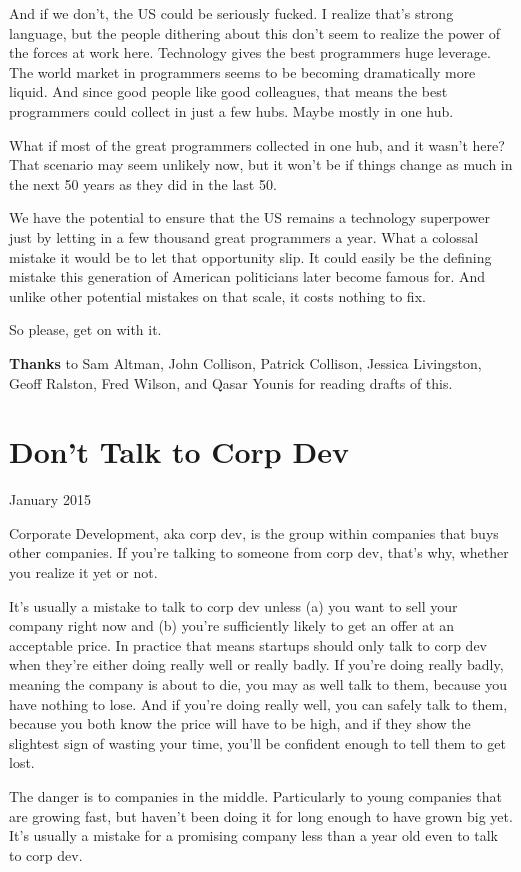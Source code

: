 \documentclass[12pt]{book}
\begin{document}
And if we don't, the US could be seriously fucked. I realize that's
strong language, but the people dithering about this don't seem to
realize the power of the forces at work here. Technology gives the best
programmers huge leverage. The world market in programmers seems to be
becoming dramatically more liquid. And since good people like good
colleagues, that means the best programmers could collect in just a few
hubs. Maybe mostly in one hub.

What if most of the great programmers collected in one hub, and it
wasn't here? That scenario may seem unlikely now, but it won't be if
things change as much in the next 50 years as they did in the last 50.

We have the potential to ensure that the US remains a technology
superpower just by letting in a few thousand great programmers a year.
What a colossal mistake it would be to let that opportunity slip. It
could easily be the defining mistake this generation of American
politicians later become famous for. And unlike other potential mistakes
on that scale, it costs nothing to fix.

So please, get on with it.


\textbf{Thanks} to Sam Altman, John Collison, Patrick Collison, Jessica
Livingston, Geoff Ralston, Fred Wilson, and Qasar Younis for reading
drafts of this.
\chapter{Don't Talk to Corp Dev}

January 2015

Corporate Development, aka corp dev, is the group within companies that
buys other companies. If you're talking to someone from corp dev, that's
why, whether you realize it yet or not.

It's usually a mistake to talk to corp dev unless (a) you want to sell
your company right now and (b) you're sufficiently likely to get an
offer at an acceptable price. In practice that means startups should
only talk to corp dev when they're either doing really well or really
badly. If you're doing really badly, meaning the company is about to
die, you may as well talk to them, because you have nothing to lose. And
if you're doing really well, you can safely talk to them, because you
both know the price will have to be high, and if they show the slightest
sign of wasting your time, you'll be confident enough to tell them to
get lost.

The danger is to companies in the middle. Particularly to young
companies that are growing fast, but haven't been doing it for long
enough to have grown big yet. It's usually a mistake for a promising
company less than a year old even to talk to corp dev.
\end{document}
